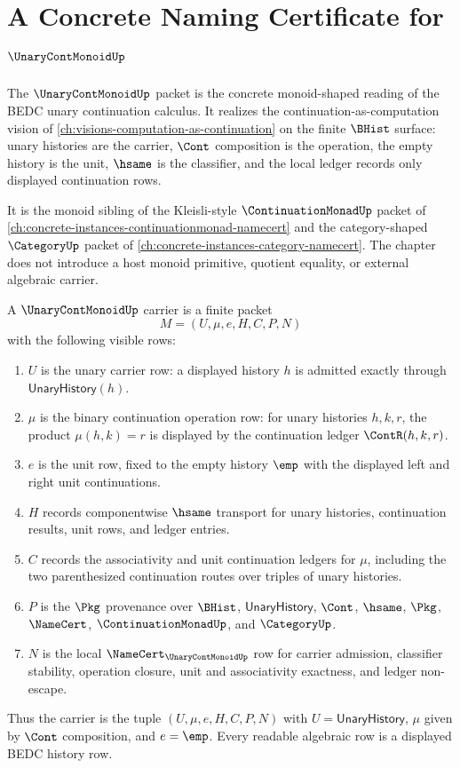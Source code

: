 \chapter{A Concrete Naming Certificate for $\UnaryContMonoidUp$}
\label{ch:concrete-instances-unarycontmonoid-namecert}

The $\UnaryContMonoidUp$ packet is the concrete monoid-shaped reading of the BEDC unary continuation calculus. It realizes the continuation-as-computation vision of \autoref{ch:visions-computation-as-continuation} on the finite $\BHist$ surface: unary histories are the carrier, $\Cont$ composition is the operation, the empty history is the unit, $\hsame$ is the classifier, and the local ledger records only displayed continuation rows.

It is the monoid sibling of the Kleisli-style $\ContinuationMonadUp$ packet of \autoref{ch:concrete-instances-continuationmonad-namecert} and the category-shaped $\CategoryUp$ packet of \autoref{ch:concrete-instances-category-namecert}. The chapter does not introduce a host monoid primitive, quotient equality, or external algebraic carrier.

\begin{definition}
\label{def:unary-cont-monoid-carrier}
A $\UnaryContMonoidUp$ carrier is a finite packet
$$
M=(U,\mu,e,H,C,P,N)
$$
with the following visible rows:
\begin{enumerate}
\item $U$ is the unary carrier row: a displayed history $h$ is admitted exactly through $\mathsf{UnaryHistory}(h)$.
\item $\mu$ is the binary continuation operation row: for unary histories $h,k,r$, the product $\mu(h,k)=r$ is displayed by the continuation ledger $\ContR(h,k,r)$.
\item $e$ is the unit row, fixed to the empty history $\emp$ with the displayed left and right unit continuations.
\item $H$ records componentwise $\hsame$ transport for unary histories, continuation results, unit rows, and ledger entries.
\item $C$ records the associativity and unit continuation ledgers for $\mu$, including the two parenthesized continuation routes over triples of unary histories.
\item $P$ is the $\Pkg$ provenance over $\BHist$, $\mathsf{UnaryHistory}$, $\Cont$, $\hsame$, $\Pkg$, $\NameCert$, $\ContinuationMonadUp$, and $\CategoryUp$.
\item $N$ is the local $\NameCert_{\UnaryContMonoidUp}$ row for carrier admission, classifier stability, operation closure, unit and associativity exactness, and ledger non-escape.
\end{enumerate}
Thus the carrier is the tuple $(U,\mu,e,H,C,P,N)$ with $U=\mathsf{UnaryHistory}$, $\mu$ given by $\Cont$ composition, and $e=\emp$. Every readable algebraic row is a displayed BEDC history row.
\end{definition}

